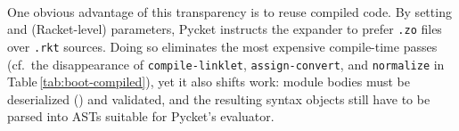 		\paragraph{}%
			One obvious advantage of this transparency is to reuse compiled code. By setting  and  (Racket-level) parameters, Pycket instructs the expander to prefer \texttt{.zo} files over \texttt{.rkt} sources. Doing so eliminates the most expensive compile-time passes (cf.\ the disappearance of \texttt{compile-linklet}, \texttt{assign-convert}, and \texttt{normalize} in Table\,\ref{tab:boot-compiled}), yet it also shifts work: module bodies must be deserialized () and validated, and the resulting syntax objects still have to be parsed into ASTs suitable for Pycket's evaluator.

